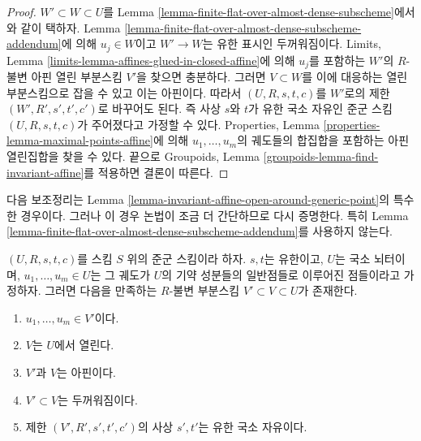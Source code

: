 \begin{proof}
$W' \subset W \subset U$를 Lemma
\ref{lemma-finite-flat-over-almost-dense-subscheme}에서와 같이 택하자.
Lemma \ref{lemma-finite-flat-over-almost-dense-subscheme-addendum}에 의해
$u_j \in W$이고 $W' \to W$는 유한 표시인 두꺼워짐이다. Limits, Lemma
\ref{limits-lemma-affines-glued-in-closed-affine}에 의해 $u_j$를 포함하는
$W'$의 $R$-불변 아핀 열린 부분스킴 $V'$을 찾으면 충분하다. 그러면
$V \subset W$를 이에 대응하는 열린 부분스킴으로 잡을 수 있고 이는 아핀이다.
따라서 $(U, R, s, t, c)$를 $W'$로의 제한 $(W', R', s', t', c')$로
바꾸어도 된다. 즉 사상 $s$와 $t$가 유한 국소 자유인 준군 스킴
$(U, R, s, t, c)$가 주어졌다고 가정할 수 있다. Properties, Lemma
\ref{properties-lemma-maximal-points-affine}에 의해 $u_1, \ldots, u_m$의
궤도들의 합집합을 포함하는 아핀 열린집합을 찾을 수 있다. 끝으로 Groupoids,
Lemma \ref{groupoids-lemma-find-invariant-affine}를 적용하면 결론이 따른다.
\end{proof}

\noindent
다음 보조정리는 Lemma
\ref{lemma-invariant-affine-open-around-generic-point}의 특수한 경우이다.
그러나 이 경우 논법이 조금 더 간단하므로 다시 증명한다. 특히 Lemma
\ref{lemma-finite-flat-over-almost-dense-subscheme-addendum}를 사용하지 않는다.

\begin{lemma}
\label{lemma-invariant-affine-open-around-generic-point-Noetherian}
$(U, R, s, t, c)$를 스킴 $S$ 위의 준군 스킴이라 하자. $s, t$는 유한이고,
$U$는 국소 뇌터이며, $u_1, \ldots, u_m \in U$는 그 궤도가 $U$의
기약 성분들의 일반점들로 이루어진 점들이라고 가정하자. 그러면 다음을
만족하는 $R$-불변 부분스킴 $V' \subset V \subset U$가 존재한다.
\begin{enumerate}
\item $u_1, \ldots, u_m \in V'$이다.
\item $V$는 $U$에서 열린다.
\item $V'$과 $V$는 아핀이다.
\item $V' \subset V$는 두꺼워짐이다.
\item 제한 $(V', R', s', t', c')$의 사상 $s', t'$는 유한 국소 자유이다.
\end{enumerate}
\end{lemma}

